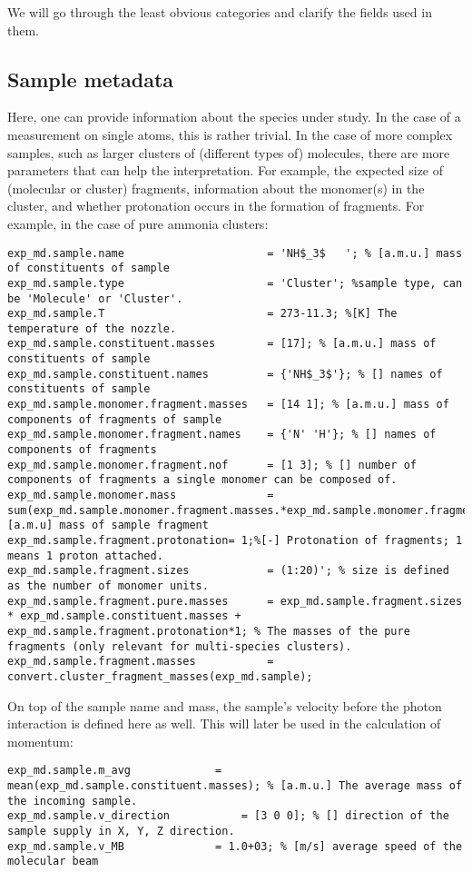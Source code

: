 We will go through the least obvious categories and clarify the fields used in them.

\subsection{Sample metadata}
Here, one can provide information about the species under study. In the case of a measurement on single atoms, this is rather trivial. In the case of more complex samples, such as larger clusters of (different types of) molecules, there are more parameters that can help the interpretation. For example, the expected size of (molecular or cluster) fragments, information about the monomer(s) in the cluster, and whether protonation occurs in the formation of fragments. For example, in the case of pure ammonia clusters:

\lstset{language=MATLAB}
\begin{lstlisting}
exp_md.sample.name						= 'NH$_3$	'; % [a.m.u.] mass of constituents of sample
exp_md.sample.type						= 'Cluster'; %sample type, can be 'Molecule' or 'Cluster'.
exp_md.sample.T							= 273-11.3; %[K] The temperature of the nozzle.
exp_md.sample.constituent.masses		= [17]; % [a.m.u.] mass of constituents of sample
exp_md.sample.constituent.names 		= {'NH$_3$'}; % [] names of constituents of sample
exp_md.sample.monomer.fragment.masses 	= [14 1]; % [a.m.u.] mass of components of fragments of sample
exp_md.sample.monomer.fragment.names 	= {'N' 'H'}; % [] names of components of fragments
exp_md.sample.monomer.fragment.nof 		= [1 3]; % [] number of components of fragments a single monomer can be composed of.
exp_md.sample.monomer.mass 				= 	sum(exp_md.sample.monomer.fragment.masses.*exp_md.sample.monomer.fragment.nof);% [a.m.u] mass of sample fragment
exp_md.sample.fragment.protonation= 1;%[-] Protonation of fragments; 1 means 1 proton attached. 
exp_md.sample.fragment.sizes 			= (1:20)'; % size is defined as the number of monomer units.
exp_md.sample.fragment.pure.masses 		= exp_md.sample.fragment.sizes * exp_md.sample.constituent.masses + exp_md.sample.fragment.protonation*1; % The masses of the pure fragments (only relevant for multi-species clusters).
exp_md.sample.fragment.masses 			= convert.cluster_fragment_masses(exp_md.sample);
\end{lstlisting}

On top of the sample name and mass, the sample's velocity before the photon interaction is defined here as well. This will later be used in the calculation of momentum:
\lstset{language=MATLAB}
\begin{lstlisting}
exp_md.sample.m_avg	 			= mean(exp_md.sample.constituent.masses); % [a.m.u.] The average mass of the incoming sample.
exp_md.sample.v_direction 			= [3 0 0]; % [] direction of the sample supply in X, Y, Z direction.
exp_md.sample.v_MB				= 1.0+03; % [m/s] average speed of the molecular beam 
\end{lstlisting}


